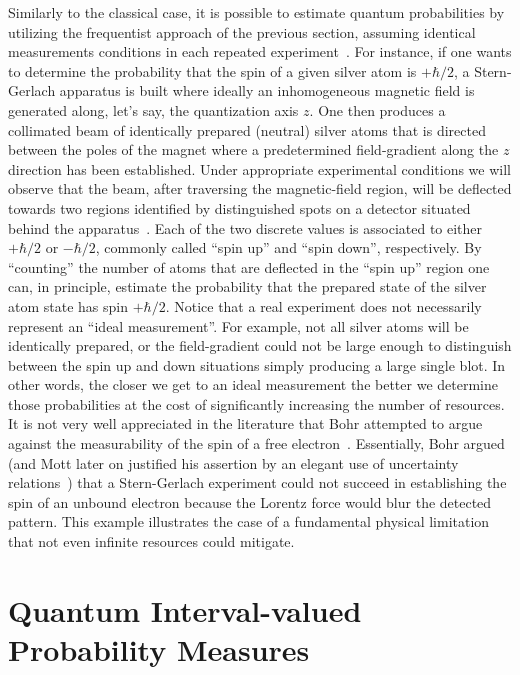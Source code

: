 \documentclass{article}
\theoremstyle{remark}
\begin{document}
Similarly to the classical case, it is possible to estimate quantum
probabilities by utilizing the frequentist approach of the previous
section, assuming identical measurements conditions in each repeated
experiment~\cite{peres1995quantum}. For instance, if one wants to
determine the probability that the spin of a given silver atom is
$+\hbar/2$, a Stern-Gerlach apparatus is built where ideally an inhomogeneous
magnetic field is generated along, let's say, the quantization axis
$z$. One then produces a collimated beam of identically prepared
(neutral) silver atoms that is directed between the poles of the magnet
where a predetermined field-gradient along the $z$ direction has
been established. Under appropriate experimental conditions we will
observe that the beam, after traversing the magnetic-field region,
will be deflected towards two regions identified by distinguished
spots on a detector situated behind the apparatus~\cite{Stern1988,peres1995quantum,544199,Griffiths2003}.
Each of the two discrete values is associated to either $+\hbar/2$
or $-\hbar/2$, commonly called ``spin up'' and ``spin down'',
respectively. By ``counting'' the number of atoms that are deflected
in the ``spin up'' region one can, in principle, estimate the probability
that the prepared state of the silver atom state has spin $+\hbar/2$.
Notice that a real experiment does not necessarily represent an ``ideal
measurement''. For example, not all silver atoms will be identically
prepared, or the field-gradient could not be large enough to distinguish
between the spin up and down situations simply producing a large single
blot. In other words, the closer we get to an ideal measurement the
better we determine those probabilities at the cost of significantly
increasing the number of resources. It is not very well appreciated
in the literature that Bohr attempted to argue against the measurability
of the spin of a free electron~\cite{Bohr1985,MartensDeMuynck1994,McEvoy2001}.
Essentially, Bohr argued (and Mott later on justified his assertion
by an elegant use of uncertainty relations~\cite{10.2307/j.ctt7ztxn5.15})
that a Stern-Gerlach experiment could not succeed in establishing
the spin of an unbound electron because the Lorentz force would blur
the detected pattern. This example illustrates the case of a fundamental
physical limitation that not even infinite resources could mitigate.

\section{Quantum Interval-valued Probability Measures}
 
\end{document}
